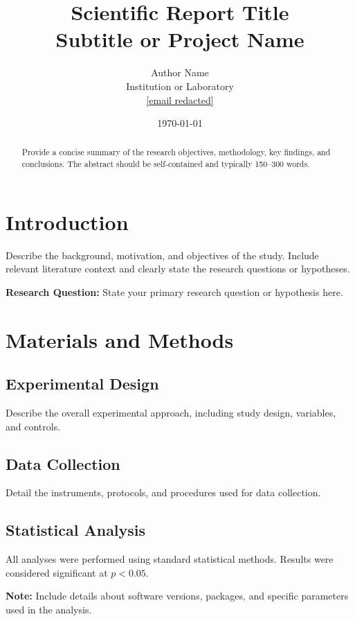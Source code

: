 \documentclass[11pt]{report}
\title{\textbf{Scientific Report Title}\\[0.5em]
\large Subtitle or Project Name}
\author{Author Name\\
\small Institution or Laboratory\\
\small \href{mailto:[email redacted]}{[email redacted]}}
\date{\today}
\begin{document}
\maketitle

\begin{abstract}
Provide a concise summary of the research objectives, methodology, key findings, and conclusions. The abstract should be self-contained and typically 150--300 words.
\end{abstract}

\tableofcontents

\chapter{Introduction}

Describe the background, motivation, and objectives of the study. Include relevant literature context and clearly state the research questions or hypotheses.

\begin{highlight}
\textbf{Research Question:} State your primary research question or hypothesis here.
\end{highlight}

\chapter{Materials and Methods}

\section{Experimental Design}

Describe the overall experimental approach, including study design, variables, and controls.

\section{Data Collection}

Detail the instruments, protocols, and procedures used for data collection.

\section{Statistical Analysis}

All analyses were performed using standard statistical methods. Results were considered significant at $p < 0.05$.

\begin{note}
\textbf{Note:} Include details about software versions, packages, and specific parameters used in the analysis.
\end{note}
\end{document}
